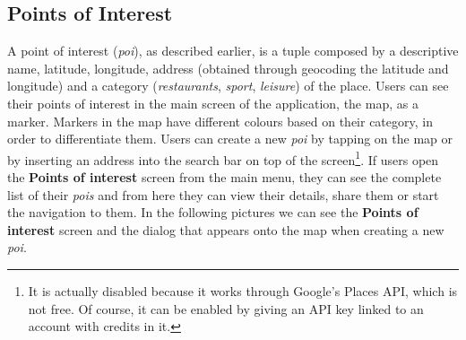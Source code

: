 \documentclass[../../main]{subfiles}
\begin{document}
\subsection{Points of Interest}
\label{ss:final-poi}

A point of interest (\textit{poi}), as described earlier, is a tuple composed by a descriptive name, latitude, longitude, address (obtained through geocoding the latitude and longitude) and a category (\textit{restaurants}, \textit{sport}, \textit{leisure}) of the place.
Users can see their points of interest in the main screen of the application, the map, as a marker.
Markers in the map have different colours based on their category, in order to differentiate them.
Users can create a new \textit{poi} by tapping on the map or by inserting an address into the search bar on top of the screen\footnote{It is actually disabled because it works through Google's Places API, which is not free. Of course, it can be enabled by giving an API key linked to an account with credits in it.}.
If users open the \textbf{Points of interest} screen from the main menu, they can see the complete list of their \textit{pois} and from here they can view their details, share them or start the navigation to them.
In the following pictures we can see the \textbf{Points of interest} screen and the dialog that appears onto the map when creating a new \textit{poi}.
\end{document}
